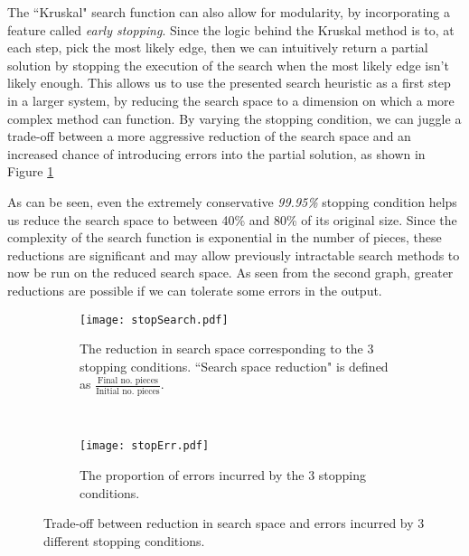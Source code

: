 The ``Kruskal" search function can also allow for modularity, by incorporating a feature called \emph{early stopping}. Since the logic behind the Kruskal method is to, at each step, pick the most likely edge, then we can intuitively return a partial solution by stopping the execution of the search when the most likely edge isn't likely enough. This allows us to use the presented search heuristic as a first step in a larger system, by reducing the search space to a dimension on which a more complex method can function. By varying the stopping condition, we can juggle a trade-off between a more aggressive reduction of the search space and an increased chance of introducing errors into the partial solution, as shown in Figure \ref{fig:stopCond}

As can be seen, even the extremely conservative \emph{99.95\%} stopping condition helps us reduce the search space to between 40\% and 80\% of its original size. Since the complexity of the search function is exponential in the number of pieces, these reductions are significant and may allow previously intractable search methods to now be run on the reduced search space. As seen from the second graph, greater reductions are possible if we can tolerate some errors in the output.
\begin{figure}[h]
        \centering
        \begin{subfigure}[b]{\textwidth}
                \centering
                \texttt{[image: stopSearch.pdf]}
                \caption{The reduction in search space corresponding to the 3 stopping conditions.  ``Search space reduction" is defined as $\frac{\mbox{Final no. pieces}}{\mbox{Initial no. pieces}}$.}
        \end{subfigure}
        ~ 
        \begin{subfigure}[b]{\textwidth}
                \centering
                \texttt{[image: stopErr.pdf]}
                \caption{The proportion of errors incurred by the 3 stopping conditions.}
        \end{subfigure}
        \caption{Trade-off between reduction in search space and errors incurred by 3 different stopping conditions.}
        \label{fig:stopCond}
\end{figure}
